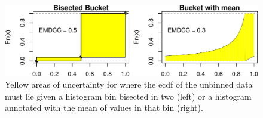 \documentclass{article}
\begin{document}
\begin{figure}[h!]
\centering
\includegraphics[width=\linewidth]{polyhistemdcc-crop.pdf}
\caption{Yellow areas of uncertainty for where the ecdf of the
  unbinned data must lie given a histogram bin bisected in two (left)
  or a histogram annotated with the mean of values in that bin (right).}
\label{fig:polyemdcc}
\end{figure}
\end{document}
